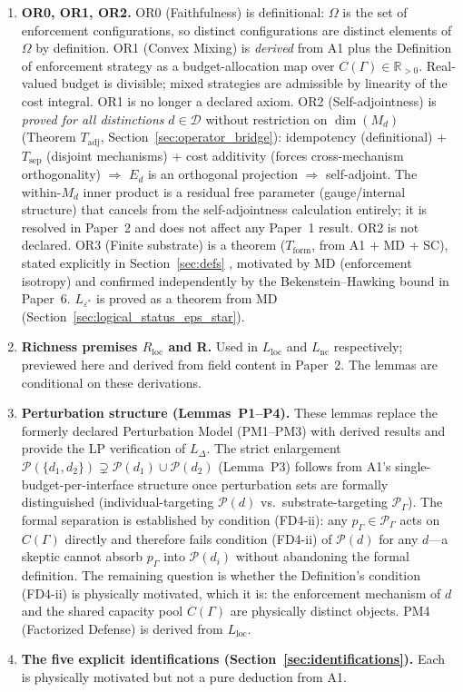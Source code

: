 \documentclass[11pt]{article}
\theoremstyle{remark}
\begin{document}
\begin{enumerate}
  \item \textbf{OR0, OR1, OR2.}  OR0 (Faithfulness) is definitional: $\Omega$ is the set of enforcement configurations, so distinct configurations are distinct elements of $\Omega$ by definition.  OR1 (Convex Mixing) is \emph{derived} from A1 plus the Definition of enforcement strategy as a budget-allocation map over $C(\Gamma) \in \mathbb{R}_{>0}$.  Real-valued budget is divisible; mixed strategies are admissible by linearity of the cost integral.  OR1 is no longer a declared axiom.  OR2 (Self-adjointness) is \emph{proved for all distinctions} $d \in \mathcal{D}$ without restriction on $\dim(M_d)$ (Theorem $T_{\mathrm{adj}}$, Section~\ref{sec:operator_bridge}): idempotency (definitional) + $T_{\mathrm{sep}}$ (disjoint mechanisms) + cost additivity (forces cross-mechanism orthogonality) $\Rightarrow$ $E_d$ is an orthogonal projection $\Rightarrow$ self-adjoint.  The within-$M_d$ inner product is a residual free parameter (gauge/internal structure) that cancels from the self-adjointness calculation entirely; it is resolved in Paper~2 and does not affect any Paper~1 result.  OR2 is not declared.  OR3 (Finite substrate) is a theorem ($T_{\mathrm{form}}$, from A1 + MD + SC), stated explicitly in Section~\ref{sec:defs} , motivated by MD (enforcement isotropy) and confirmed independently by the Bekenstein--Hawking bound in Paper~6.  $L_{\varepsilon^*}$ is proved as a theorem from MD (Section~\ref{sec:logical_status_eps_star}).

  \item \textbf{Richness premises $R_{\mathrm{loc}}$ and R.}  Used in $L_{\mathrm{loc}}$ and $L_{\mathrm{nc}}$ respectively; previewed here and derived from field content in Paper~2.  The lemmas are conditional on these derivations.

  \item \textbf{Perturbation structure (Lemmas~P1--P4).}  These lemmas replace the formerly declared Perturbation Model (PM1--PM3) with derived results and provide the LP verification of $L_\Delta$.  The strict enlargement $\mathcal{P}(\{d_1,d_2\}) \supsetneq \mathcal{P}(d_1) \cup \mathcal{P}(d_2)$ (Lemma~P3) follows from A1's single-budget-per-interface structure once perturbation sets are formally distinguished (individual-targeting $\mathcal{P}(d)$ vs.\ substrate-targeting $\mathcal{P}_\Gamma$).  The formal separation is established by condition (FD4-ii): any $p_\Gamma \in \mathcal{P}_\Gamma$ acts on $C(\Gamma)$ directly and therefore fails condition (FD4-ii) of $\mathcal{P}(d)$ for any $d$---a skeptic cannot absorb $p_\Gamma$ into $\mathcal{P}(d_i)$ without abandoning the formal definition.  The remaining question is whether the Definition's condition (FD4-ii) is physically motivated, which it is: the enforcement mechanism of $d$ and the shared capacity pool $C(\Gamma)$ are physically distinct objects.  PM4 (Factorized Defense) is derived from $L_{\mathrm{loc}}$.

  \item \textbf{The five explicit identifications (Section~\ref{sec:identifications}).}  Each is physically motivated but not a pure deduction from A1.

\end{enumerate}
\end{document}
